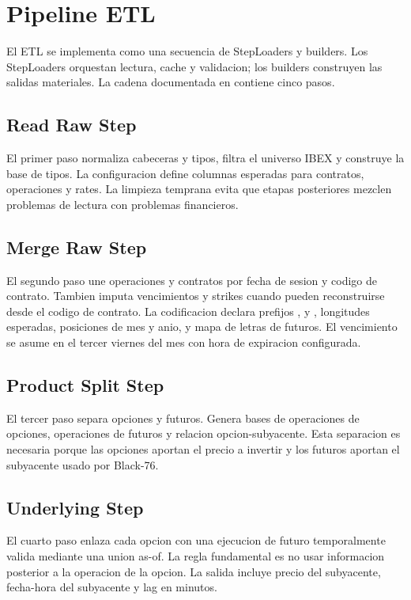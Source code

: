 \section{Pipeline ETL}

El ETL se implementa como una secuencia de StepLoaders y builders. Los StepLoaders orquestan lectura, cache y validacion; los builders construyen las salidas materiales. La cadena documentada en  contiene cinco pasos.

\subsection{Read Raw Step}

El primer paso normaliza cabeceras y tipos, filtra el universo IBEX y construye la base de tipos. La configuracion define columnas esperadas para contratos, operaciones y rates. La limpieza temprana evita que etapas posteriores mezclen problemas de lectura con problemas financieros.

\subsection{Merge Raw Step}

El segundo paso une operaciones y contratos por fecha de sesion y codigo de contrato. Tambien imputa vencimientos y strikes cuando pueden reconstruirse desde el codigo de contrato. La codificacion declara prefijos ,  y , longitudes esperadas, posiciones de mes y anio, y mapa de letras de futuros. El vencimiento se asume en el tercer viernes del mes con hora de expiracion configurada.

\subsection{Product Split Step}

El tercer paso separa opciones y futuros. Genera bases de operaciones de opciones, operaciones de futuros y relacion opcion-subyacente. Esta separacion es necesaria porque las opciones aportan el precio a invertir y los futuros aportan el subyacente usado por Black-76.

\subsection{Underlying Step}

El cuarto paso enlaza cada opcion con una ejecucion de futuro temporalmente valida mediante una union as-of. La regla fundamental es no usar informacion posterior a la operacion de la opcion. La salida incluye precio del subyacente, fecha-hora del subyacente y lag en minutos.

